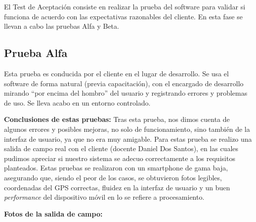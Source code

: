 		El Test de Aceptación consiste en realizar la prueba del software para validar si funciona de acuerdo con las expectativas razonables del cliente. En esta fase se llevan a cabo las pruebas Alfa y Beta.

	\subsection{Prueba Alfa}

		Esta prueba es conducida por el cliente en el lugar de desarrollo. Se usa el software de forma natural (previa capacitación), con el encargado de desarrollo mirando “por encima del hombro” del usuario y registrando errores y problemas de uso. Se lleva acabo en un entorno controlado.

		\textbf{Conclusiones de estas pruebas:}
		Tras esta prueba, nos dimos cuenta de algunos errores y posibles mejoras, no solo de funcionamiento, sino también de la interfaz de usuario, ya que no era muy amigable. 
		Para estas prueba se realizo una salida de campo real con el cliente (docente Daniel Dos Santos), en las cuales pudimos apreciar si nuestro sistema se adecuo correctamente a los requisitos planteados.
		Estas pruebas se realizaron con un smartphone de gama baja, asegurando que, siendo el peor de los casos, se obtuvieron fotos legibles, coordenadas del GPS correctas, fluidez en la interfaz de usuario y un buen \textit{performance} del dispositivo móvil en lo se refiere a procesamiento.
		\newpage 

		\textbf{Fotos de la salida de campo:}

